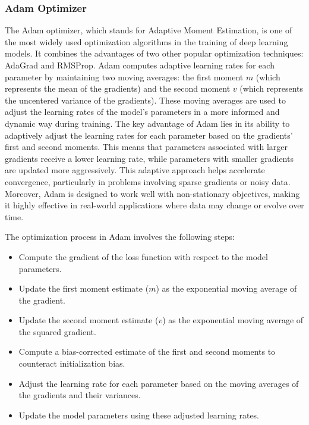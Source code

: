 \subsubsection{Adam Optimizer}

The Adam optimizer, which stands for Adaptive Moment Estimation, is one of the most widely used optimization algorithms in the training of deep learning models. It combines the advantages of two other popular optimization techniques: AdaGrad and RMSProp. Adam computes adaptive learning rates for each parameter by maintaining two moving averages: the first moment \(m\) (which represents the mean of the gradients) and the second moment \(v\) (which represents the uncentered variance of the gradients). These moving averages are used to adjust the learning rates of the model's parameters in a more informed and dynamic way during training.
The key advantage of Adam lies in its ability to adaptively adjust the learning rates for each parameter based on the gradients' first and second moments. This means that parameters associated with larger gradients receive a lower learning rate, while parameters with smaller gradients are updated more aggressively. This adaptive approach helps accelerate convergence, particularly in problems involving sparse gradients or noisy data. Moreover, Adam is designed to work well with non-stationary objectives, making it highly effective in real-world applications where data may change or evolve over time.

The optimization process in Adam involves the following steps:
\begin{itemize}
    \item Compute the gradient of the loss function with respect to the model parameters.
    \item Update the first moment estimate (\(m\)) as the exponential moving average of the gradient.
    \item Update the second moment estimate (\(v\)) as the exponential moving average of the squared gradient.
    \item Compute a bias-corrected estimate of the first and second moments to counteract initialization bias.
    \item Adjust the learning rate for each parameter based on the moving averages of the gradients and their variances.
    \item Update the model parameters using these adjusted learning rates.
\end{itemize}

